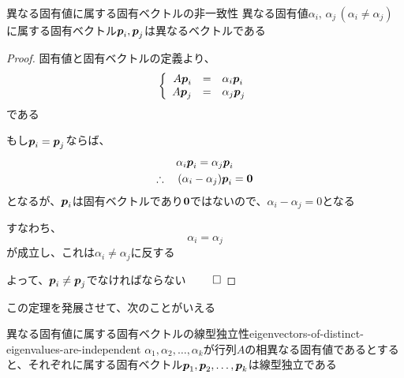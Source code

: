 \documentclass[../../../topic_linear-algebra]{subfiles}
\begin{document}
\begin{theorem*}{異なる固有値に属する固有ベクトルの非一致性}
  異なる固有値$\alpha_i,\, \alpha_j \, (\alpha_i \neq \alpha_j)$に属する固有ベクトル$\vb*{p}_i, \vb*{p}_j$は異なるベクトルである
\end{theorem*}

\begin{proof}
  固有値と固有ベクトルの定義より、
  \begin{equation*}
    \left\{
    \begin{array}{rcl}
      A\vb*{p}_i & = & \alpha_i \vb*{p}_i \\
      A\vb*{p}_j & = & \alpha_j \vb*{p}_j
    \end{array}
    \right.
  \end{equation*}
  である

  もし$\vb*{p}_i = \vb*{p}_j$ならば、
  \begin{gather*}
    \alpha_i \vb*{p}_i              = \alpha_j \vb*{p}_i \\
    \therefore \quad (\alpha_i - \alpha_j) \vb*{p}_i = \vb*{0}
  \end{gather*}
  となるが、$\vb*{p}_i$は固有ベクトルであり$\vb*{0}$ではないので、$\alpha_i - \alpha_j = 0$となる

  すなわち、
  \begin{equation*}
    \alpha_i = \alpha_j
  \end{equation*}
  が成立し、これは$\alpha_i \neq \alpha_j$に反する

  よって、$\vb*{p}_i \neq \vb*{p}_j$でなければならない $\qed$
\end{proof}

この定理を発展させて、次のことがいえる

\begin{theorem}{異なる固有値に属する固有ベクトルの線型独立性}{eigenvectors-of-distinct-eigenvalues-are-independent}
  $\alpha_1, \alpha_2, \ldots, \alpha_k$が行列$A$の相異なる固有値であるとすると、それぞれに属する固有ベクトル$\vb*{p}_1, \vb*{p}_2, \ldots, \vb*{p}_k$は線型独立である
\end{theorem}
\end{document}

